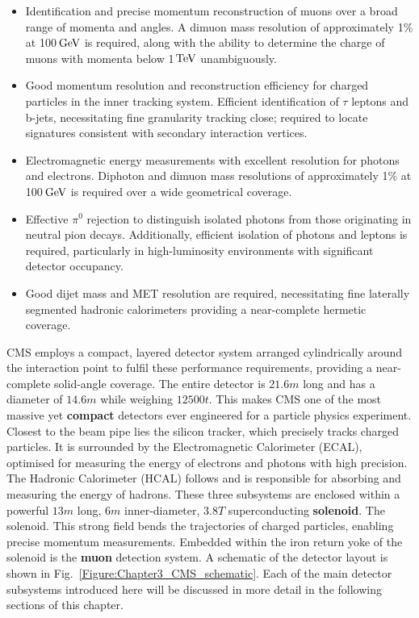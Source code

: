 \begin{itemize}
    \item Identification and precise momentum reconstruction of muons over a broad range of momenta and angles. A dimuon mass resolution of approximately 1\% at 100$\,\text{Ge\hspace{-.08em}V}$ is required, along with the ability to determine the charge of muons with momenta below 1$\,\text{Te\hspace{-.08em}V}$ unambiguously.

    \item Good momentum resolution and reconstruction efficiency for charged particles in the inner tracking system. Efficient identification of $\tau$ leptons and b-jets, necessitating fine granularity tracking close; required to locate signatures consistent with secondary interaction vertices.

    \item Electromagnetic energy measurements with excellent resolution for photons and electrons. Diphoton and dimuon mass resolutions of approximately 1\% at 100$\,\text{Ge\hspace{-.08em}V}$ is required over a wide geometrical coverage.

    \item Effective $\pi^0$ rejection to distinguish isolated photons from those originating in neutral pion decays. Additionally, efficient isolation of photons and leptons is required, particularly in high-luminosity environments with significant detector occupancy.

    \item Good dijet mass and \ac{MET} resolution are required, necessitating fine laterally segmented hadronic calorimeters providing a near-complete hermetic coverage.
\end{itemize}

CMS employs a compact, layered detector system arranged cylindrically around the interaction point to fulfil these performance requirements, providing a near-complete solid-angle coverage. The entire detector is $21.6\unit{m}$ long and has a diameter of $14.6\unit{m}$ while weighing $12500\unit{t}$. This makes CMS one of the most massive yet \textbf{compact} detectors ever engineered for a particle physics experiment. Closest to the beam pipe lies the silicon tracker, which precisely tracks charged particles. It is surrounded by the Electromagnetic Calorimeter (ECAL), optimised for measuring the energy of electrons and photons with high precision. The Hadronic Calorimeter (HCAL) follows and is responsible for absorbing and measuring the energy of hadrons. These three subsystems are enclosed within a powerful $13\unit{m}$ long, $6\unit{m}$ inner-diameter, $3.8\unit{T}$ superconducting \textbf{solenoid}. The solenoid. This strong field bends the trajectories of charged particles, enabling precise momentum measurements. Embedded within the iron return yoke of the solenoid is the \textbf{muon} detection system. A schematic of the detector layout is shown in Fig.~\ref{Figure:Chapter3_CMS_schematic}. Each of the main detector subsystems introduced here will be discussed in more detail in the following sections of this chapter.


